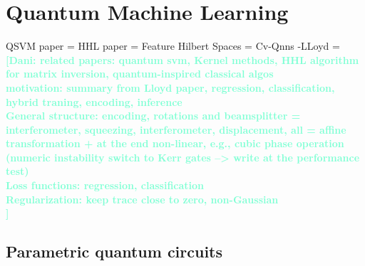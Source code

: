 \documentclass[12pt, a4paper,  nobibnotes]{article}
\newcommand{\nd}[1]{\textcolor{Aquamarine}{\textbf{[Dani: #1]}}}
\begin{document}
\section{Quantum Machine Learning}
QSVM paper = \cite{QSVMPaper}
HHL paper = \cite{HHLPaper}
Feature Hilbert Spaces = \cite{FeatureHilbertSpaces}
Cv-Qnns -LLoyd = \cite{CVQNNLLoyd}
\nd{related papers: quantum svm, Kernel methods, HHL algorithm for matrix inversion, quantum-inspired classical algos\\
motivation: summary from Lloyd paper, regression, classification, hybrid traning, encoding, inference\\
General structure: encoding, rotations and beamsplitter = interferometer, squeezing, interferometer, displacement, all = affine transformation + at the end non-linear, e.g., cubic phase operation (numeric instability switch to Kerr gates --> write at the performance test)  \\
Loss functions: regression, classification\\
Regularization: keep trace close to zero, non-Gaussian\\
}
\subsection{Parametric quantum circuits}
\end{document}
